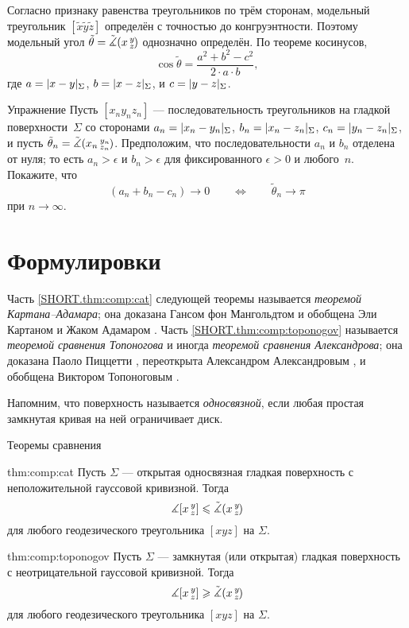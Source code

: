Согласно признаку равенства треугольников по трём сторонам,
модельный треугольник $[\tilde x\tilde y\tilde z]$ определён с точностью до конгруэнтности.
Поэтому модельный угол $\tilde\theta=\tilde\measuredangle(x\,{}^{y}_{z}\hspace{-0.2ex})$ однозначно определён.
По теореме косинусов, 
\[\cos \tilde\theta=\frac{a^2+b^2-c^2}{2\cdot a \cdot b},\]
где $a=\dist{x}{y}{\Sigma}$, $b=\dist{x}{z}{\Sigma}$, и $c=\dist{y}{z}{\Sigma}$.

\begin{thm}{Упражнение}\label{ex:wide-hinges}
Пусть $[x_ny_nz_n]$ --- последовательность треугольников на гладкой поверхности~$\Sigma$ 
со сторонами $a_n=\dist{x_n}{y_n}{\Sigma}$,
$b_n=\dist{x_n}{z_n}{\Sigma}$,
$c_n=\dist{y_n}{z_n}{\Sigma}$, и пусть $\tilde\theta_n=\tilde\measuredangle(x_n\,{}^{y_n}_{z_n}\hspace{-0.2ex})$.
Предположим, что последовательности $a_n$ и $b_n$ отделена от нуля;
то есть $a_n>\epsilon$ и $b_n>\epsilon$ для фиксированного $\epsilon>0$ и любого~$n$.
Покажите, что
\[(a_n+b_n-c_n)\to 0\qquad\iff\qquad \tilde\theta_n\to \pi\]
при $n\to\infty$.
\end{thm}

\section{Формулировки}

Часть \ref{SHORT.thm:comp:cat} следующей теоремы называется {}\emph{теоремой Картана--Адамара};
она доказана 
Гансом фон Мангольдтом \cite{mangoldt} и обобщена 
Эли Картаном \cite{cartan} и
Жаком Адамаром \cite{hadamard}.
Часть \ref{SHORT.thm:comp:toponogov} называется {}\emph{теоремой сравнения Топоногова} и иногда {}\emph{теоремой сравнения Александрова};
она доказана Паоло Пиццетти \cite{pizzetti}, переоткрыта Александром Александровым \cite{aleksandrov}, и 
обобщена Виктором Топоноговым \cite{toponogov1957}.%

Напомним, что поверхность называется \emph{односвязной}, если любая простая замкнутая кривая на ней ограничивает диск.

\begin{thm}{Теоремы сравнения}
\label{thm:comp}
\ 

\begin{subthm}{thm:comp:cat}
Пусть $\Sigma$ --- открытая односвязная гладкая поверхность с неположительной гауссовой кривизной.
Тогда 
\[\measuredangle[x\,{}^{y}_{z}]\leqslant\tilde\measuredangle(x\,{}^{y}_{z}\hspace{-0.2ex})\]
для любого геодезического треугольника $[xyz]$ на $\Sigma$.
\end{subthm}

\begin{subthm}{thm:comp:toponogov}
Пусть $\Sigma$ --- замкнутая (или открытая) гладкая поверхность с неотрицательной гауссовой кривизной.
Тогда 
 \[\measuredangle[x\,{}^{y}_{z}]\geqslant\tilde\measuredangle(x\,{}^{y}_{z}\hspace{-0.2ex})\]
для любого геодезического треугольника $[xyz]$ на $\Sigma$.
\end{subthm}

\end{thm}

